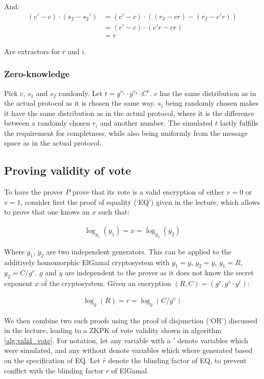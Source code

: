 \documentclass[a4paper]{scrreprt}
\begin{document}
And:
\begin{align*}
  (c' - c) \cdot (s_2 - s_2') & = (c' - c) \cdot ((r_2 - cr) - (r_2 - c' r)) \\
                              & = (c' - c) \cdot (c' r - cr) \\
                              & = r
\end{align*}

Are extractors for $r$ and $i$.

\subsubsection{Zero-knowledge}

Pick $c$, $s_1$ and $s_2$ randomly. Let $t = g^{s_1} \cdot y^{s_2} \cdot C^c$.
$c$ has the same distribution as in the actual protocol as it is chosen the
same way. $s_i$ being randomly chosen makes it have the same distribution as in
the actual protocol, where it is the difference between a randomly chosen $r_i$
and another number. The simulated $t$ lastly fulfills the requirement for
completness, while also being uniformly from the message space as in the actual
protocol.

\subsection{Proving validity of vote}

To have the prover $P$ prove that its vote is a valid encryption of either $v =
0$ or $v = 1$, consider first the proof of equality (`EQ') given in the
lecture, which allows to prove that one knows an $x$ such that:

\begin{align*}
  \log_{g_1}(y_1) = x = \log_{g_2}(y_2)
\end{align*}

Where $g_1$, $g_2$ are two independent generators. This can be applied to the
additively homomorphic ElGamal cryptosystem with $g_1 = g$, $g_2 = y$, $y_1 =
R$, $y_2 = C / g^v$. $g$ and $y$ are independent to the prover as it does not
know the secret exponent $x$ of the cryptosystem. Given an encryption $(R, C) =
(g^r, g^v \cdot y^r)$:

\begin{align*}
  \log_{g}(R) = r = \log_{y}(C / g^v)
\end{align*}

We then combine two such proofs using the proof of disjunction (`OR') discussed
in the lecture, leading to a ZKPK of vote validity shown in algorithm
\ref{alg:valid_vote}. For notation, let any variable with a $'$ denote
variables which were simulated, and any without denote variables which where
generated based on the specification of EQ. Let $\hat{r}$ denote the blinding
factor of EQ, to prevent conflict with the blinding factor $r$ of ElGamal.
\end{document}
